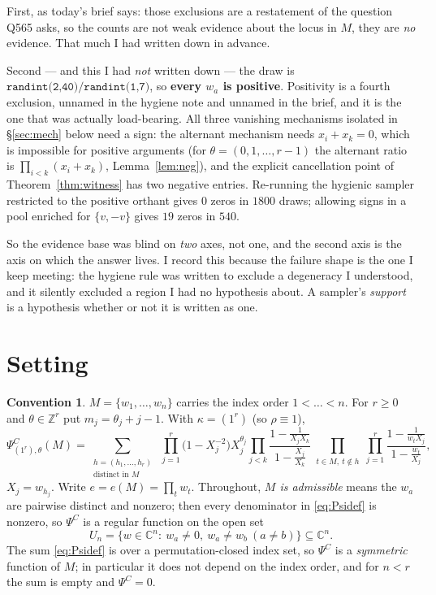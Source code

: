 \documentclass[11pt]{article}
\theoremstyle{definition}
\newtheorem{convention}[theorem]{Convention}
\theoremstyle{remark}
\newcommand{\PsiC}{\Psi^{C}}
\newcommand{\CC}{\mathbb{C}}
\begin{document}
First, as today's brief says: those exclusions are a restatement of the question
Q565 asks, so the counts are not weak evidence about the locus in $M$, they are
\emph{no} evidence. That much I had written down in advance.

Second --- and this I had \emph{not} written down --- the draw is
$\texttt{randint(2,40)}/\texttt{randint(1,7)}$, so \textbf{every $w_a$ is
positive}. Positivity is a fourth exclusion, unnamed in the hygiene note and
unnamed in the brief, and it is the one that was actually load-bearing. All three
vanishing mechanisms isolated in \S\ref{sec:mech} below need a sign: the alternant
mechanism needs $x_i+x_k=0$, which is impossible for positive arguments (for
$\theta=(0,1,\dots,r-1)$ the alternant ratio is $\prod_{i<k}(x_i+x_k)$,
Lemma~\ref{lem:neg}), and the explicit cancellation point of
Theorem~\ref{thm:witness} has two negative entries. Re-running the hygienic
sampler restricted to the positive orthant gives $0$ zeros in $1800$ draws;
allowing signs in a pool enriched for $\{v,-v\}$ gives $19$ zeros in $540$.

So the evidence base was blind on \emph{two} axes, not one, and the second axis is
the axis on which the answer lives. I record this because the failure shape is the
one I keep meeting: the hygiene rule was written to exclude a degeneracy I
understood, and it silently excluded a region I had no hypothesis about.
A sampler's \emph{support} is a hypothesis whether or not it is written as one.

\section{Setting}

\begin{convention}\label{conv:psi}
$M=\{w_1,\dots,w_n\}$ carries the index order $1<\dots<n$. For $r\ge0$ and
$\theta\in\mathbb{Z}^r$ put $m_j=\theta_j+j-1$. With $\kappa=(1^r)$ (so
$\rho\equiv1$),
\begin{equation}\label{eq:Psidef}
  \PsiC_{(1^r),\theta}(M)
  =\sum_{\substack{h=(h_1,\dots,h_r)\\ \text{distinct in }M}}
   \;\prod_{j=1}^{r}\bigl(1-X_j^{-2}\bigr)X_j^{\theta_j}
   \prod_{j<k}\frac{1-\frac{1}{X_jX_k}}{1-\frac{X_j}{X_k}}
   \prod_{\substack{t\in M,\ t\notin h}}\prod_{j=1}^{r}
      \frac{1-\frac{1}{w_tX_j}}{1-\frac{w_t}{X_j}},
\end{equation}
$X_j=w_{h_j}$. Write $e=e(M)=\prod_{t}w_t$. Throughout, \emph{$M$ is admissible}
means the $w_a$ are pairwise distinct and nonzero; then every denominator in
\eqref{eq:Psidef} is nonzero, so $\PsiC$ is a regular function on the open set
\[
  U_n=\{w\in\CC^n:\ w_a\ne0,\ w_a\ne w_b\ (a\ne b)\}\subseteq\CC^n .
\]
The sum \eqref{eq:Psidef} is over a permutation-closed index set, so $\PsiC$ is a
\emph{symmetric} function of $M$; in particular it does not depend on the index
order, and for $n<r$ the sum is empty and $\PsiC=0$.
\end{convention}
\end{document}
